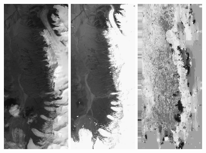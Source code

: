 \begin{figure}
\begin{center}
\includegraphics[width=35mm]{FIGS/SeismGuylia/250802_ortho.jpg}
\includegraphics[width=35mm]{FIGS/SeismGuylia/260608_ortho.jpg}
\includegraphics[width=35mm]{FIGS/SeismGuylia/Px1.jpg}

\end{center}
\end{figure}
